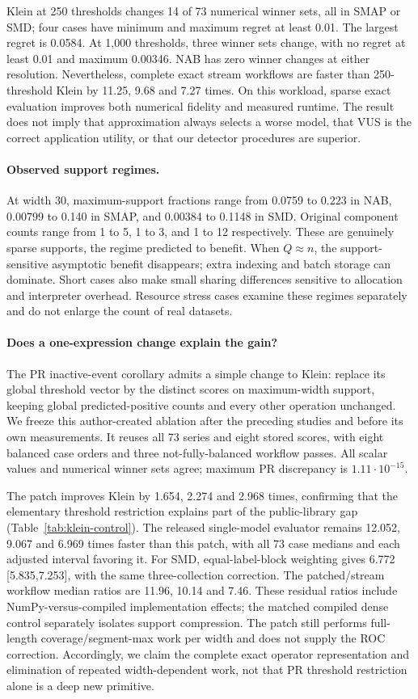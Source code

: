 Klein at 250 thresholds changes 14 of 73 numerical winner sets, all in SMAP
or SMD; four cases have minimum and maximum regret at least 0.01. The largest
regret is 0.0584. At 1,000 thresholds, three winner sets change, with no regret
at least 0.01 and maximum 0.00346. NAB has zero winner changes at either
resolution. Nevertheless, complete exact stream workflows are faster than
250-threshold Klein by 11.25, 9.68 and 7.27 times. On this workload, sparse exact
evaluation improves both numerical fidelity and measured runtime. The result
does not imply that approximation always selects a worse model, that VUS is
the correct application utility, or that our detector procedures are superior.

\paragraph{Observed support regimes.}
At width 30, maximum-support fractions range from 0.0759 to 0.223 in NAB,
0.00799 to 0.140 in SMAP, and 0.00384 to 0.1148 in SMD. Original component
counts range from 1 to 5, 1 to 3, and 1 to 12 respectively. These are genuinely
sparse supports, the regime predicted to benefit. When $Q\approx n$, the
support-sensitive asymptotic benefit disappears; extra indexing and batch
storage can dominate. Short cases also make small sharing differences sensitive
to allocation and interpreter overhead. Resource stress cases examine these
regimes separately and do not enlarge the count of real datasets.

\paragraph{Does a one-expression change explain the gain?}
The PR inactive-event corollary admits a simple change to Klein: replace its
global threshold vector by the distinct scores on maximum-width support,
keeping global predicted-positive counts and every other operation unchanged.
We freeze this author-created ablation after the preceding studies and before
its own measurements. It reuses all 73 series and eight stored scores, with
eight balanced case orders and three not-fully-balanced workflow passes.
All scalar values and numerical winner sets agree; maximum PR discrepancy is
$1.11\cdot10^{-15}$.

The patch improves Klein by 1.654, 2.274 and 2.968 times, confirming that the
elementary threshold restriction explains part of the public-library gap
(Table~\ref{tab:klein-control}). The released single-model evaluator remains
12.052, 9.067 and 6.969 times faster than this patch, with all 73 case medians
and each adjusted interval favoring it. For SMD, equal-label-block weighting
gives 6.772 [5.835,7.253], with the same three-collection correction.
The patched/stream workflow median ratios are 11.96, 10.14 and 7.46.
These residual ratios include NumPy-versus-compiled implementation effects;
the matched compiled dense control separately isolates support compression.
The patch still performs full-length coverage/segment-max work per width and
does not supply the ROC correction. Accordingly, we claim the complete exact
operator representation and elimination of repeated width-dependent work,
not that PR threshold restriction alone is a deep new primitive.

